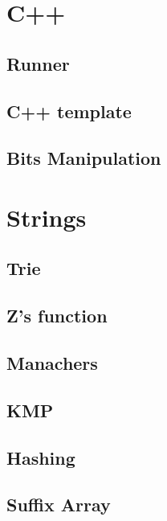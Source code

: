 \section{C++}
\subsection{Runner}
\raggedbottom
\hrulefill
\subsection{C++ template}
\raggedbottom
\hrulefill
\subsection{Bits Manipulation}
\raggedbottom
\hrulefill

\section{Strings}
\subsection{Trie}
\raggedbottom
\hrulefill
\subsection{Z's function}
\raggedbottom
\hrulefill
\subsection{Manachers}
\raggedbottom
\hrulefill
\subsection{KMP}
\raggedbottom
\hrulefill
\subsection{Hashing}
\raggedbottom
\hrulefill
\subsection{Suffix Array}
\raggedbottom
\hrulefill

